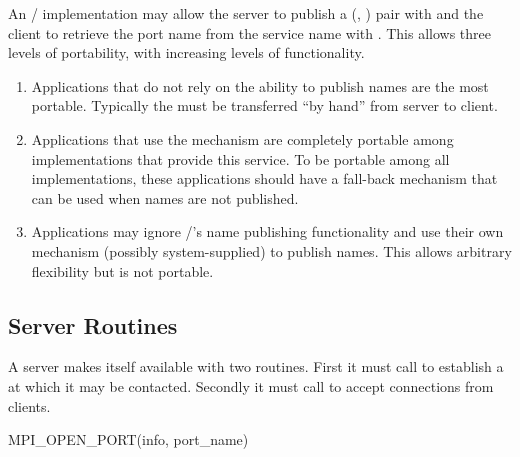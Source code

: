 An \MPI/ implementation may allow the
server to publish a (, )
pair with  and the client
to retrieve the port name from the service name
with . This allows three levels
of portability, with increasing levels of functionality.
\begin{enumerate}
\item Applications that do not rely on the ability to publish
names are the most portable. Typically the 
must be transferred ``by hand'' from server to client.
\item Applications that use the 
mechanism are completely portable among implementations
that provide this service. To be portable among all
implementations, these applications should have a fall-back mechanism
that can be used when names are not published.
\item Applications may ignore \MPI/'s name publishing
functionality and use their own mechanism (possibly
system-supplied) to publish names. This allows arbitrary
flexibility but is not portable.
\end{enumerate}


\subsection{Server Routines}


A server makes itself available with two routines. First
it must call  to establish
a  at which it may be contacted.
Secondly it must call  to accept
connections from clients.

%
\begin{funcdef}{MPI\_OPEN\_PORT}{(\mbox{info}, \mbox{port\_name})}
\end{funcdef}

